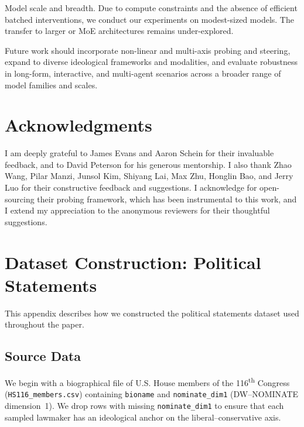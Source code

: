 \documentclass[11pt]{article}
\begin{document}
Model scale and breadth. Due to compute constraints and the absence of efficient batched interventions, we conduct our experiments on modest-sized models. The transfer to larger or MoE architectures remains under-explored.

Future work should incorporate non-linear and multi-axis probing and steering, expand to diverse ideological frameworks and modalities, and evaluate robustness in long-form, interactive, and multi-agent scenarios across a broader range of model families and scales.

\section*{Acknowledgments}

I am deeply grateful to James Evans and Aaron Schein for their invaluable feedback, and to David Peterson for his generous mentorship. I also thank Zhao Wang, Pilar Manzi, Junsol Kim, Shiyang Lai, Max Zhu, Honglin Bao, and Jerry Luo for their constructive feedback and suggestions. I acknowledge \citet{kimLinearRepresentationsPolitical2025} for open-sourcing their probing framework, which has been instrumental to this work, and I extend my appreciation to the anonymous reviewers for their thoughtful suggestions.

%


\appendix

\section{Dataset Construction: Political Statements}
\label{app:dataset}

This appendix describes how we constructed the political statements dataset used throughout the paper.

\subsection{Source Data}
We begin with a biographical file of U.S. House members of the 116\textsuperscript{th} Congress (\texttt{HS116\_members.csv}) containing \texttt{bioname} and \texttt{nominate\_dim1} (DW--NOMINATE dimension~1). We drop rows with missing \texttt{nominate\_dim1} to ensure that each sampled lawmaker has an ideological anchor on the liberal--conservative axis.
\end{document}
